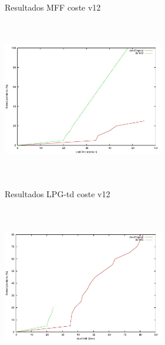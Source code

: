 \documentclass{beamer}
\begin{document}
\begin{frame}{Resultados MFF coste v12}
    \begin{center}
    \includegraphics[width=7cm, height=7cm]{mff-or-12-cost}
    \end{center}
\end{frame}


\begin{frame}{Resultados LPG-td coste v12}
    \begin{center}
    \includegraphics[width=7cm, height=7cm]{lpg-or-12-cost}
    \end{center}
\end{frame}

\end{document}
